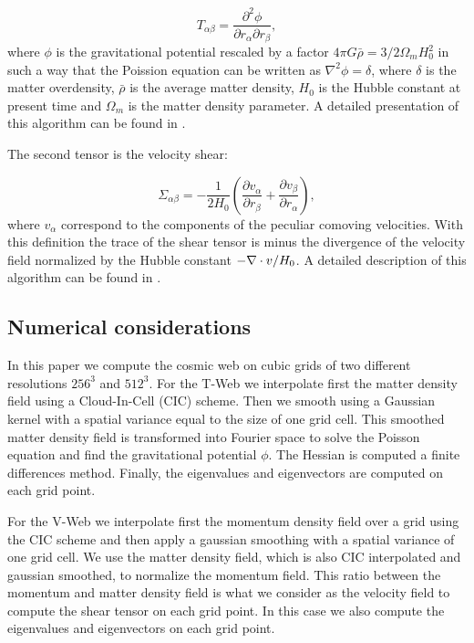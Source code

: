 \documentclass[useAMS,usenatbib]{mn2e}
\begin{document}
\begin{equation}
T_{\alpha\beta} = \frac{\partial^2\phi}{\partial
  r_{\alpha}\partial r_{\beta}}, 
\end{equation}
%
where $\phi$ is the gravitational potential rescaled by a factor $4\pi
G\bar{\rho}=3/2\Omega_m H_{0}^2$ in such a way that the Poission
equation can be written as $\nabla^{2}\phi  = \delta$, where $\delta$
is the matter overdensity, $\bar{\rho}$ is the average matter density,
$H_{0}$ is the Hubble constant at present time and $\Omega_m$ is the
matter density parameter. A detailed presentation of this algorithm
can be found in \citep{Tweb}.

The second tensor is the velocity shear:

\begin{equation}
\Sigma_{\alpha\beta} = -\frac{1}{2H_{0}}\left(\frac{\partial
  v_{\alpha}}{\partial r_{\beta}}+ \frac{\partial v_{\beta}}{\partial
  r_{\alpha}}\right), 
\end{equation}
%
where $v_{\alpha}$ correspond to the components of the peculiar
comoving velocities. With this definition the trace of the shear
tensor is minus the divergence of the velocity field normalized by the
Hubble constant $-\nabla\cdot {\bf}v /H_{0}$. A detailed description
of this algorithm can be found in \citep{Vweb}.




\subsection{Numerical considerations}

In this paper we compute the cosmic web on cubic grids of two different
resolutions $256^3$ and $512^3$. For the T-Web we interpolate first
the matter density field using a Cloud-In-Cell (CIC) scheme. Then we
smooth using a Gaussian kernel with a spatial variance equal to the
size of one grid cell. This smoothed matter density field is
transformed into Fourier space to solve the Poisson equation and find
the gravitational potential $\phi$. The Hessian is computed a finite
differences method. Finally, the eigenvalues and eigenvectors are
computed on each grid point.

For the V-Web we interpolate first the momentum density field over a
grid using the CIC scheme and then apply a gaussian smoothing with a
spatial variance of one grid cell. We use the matter density field,
which is also CIC interpolated and gaussian smoothed, to normalize the
momentum field. This ratio between the momentum and matter density
field is what we consider as the velocity field to compute the shear
tensor on each grid point. In this case we also compute the
eigenvalues and eigenvectors on each grid point.
\end{document}

